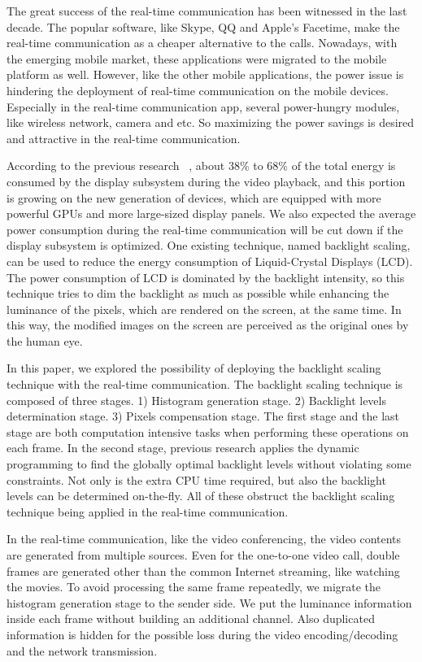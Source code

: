The great success of the real-time communication has been witnessed in
the last decade. The popular software, like Skype, QQ and Apple's
Facetime, make the real-time communication as a cheaper alternative to
the calls. Nowadays, with the emerging mobile market, these
applications were migrated to the mobile platform as well. However,
like the other mobile applications, the power issue is hindering the
deployment of real-time communication on the mobile
devices. Especially in the real-time communication app, several
power-hungry modules, like wireless network, camera and etc. So
maximizing the power savings is desired and attractive in the
real-time communication.


According to the previous research ~\cite{AG10}, about 38\% to 68\% of the
total energy is consumed by the display subsystem during the video
playback, and this portion is growing on the new generation of
devices, which are equipped with more powerful GPUs and more
large-sized display panels. We also expected the average power
consumption during the real-time communication will be cut down if the
display subsystem is optimized. One existing technique, named
backlight scaling, can be used to reduce the energy consumption of
Liquid-Crystal Displays (LCD). The power consumption of LCD is
dominated by the backlight intensity, so this technique tries to dim
the backlight as much as possible while enhancing the luminance of the
pixels, which are rendered on the screen, at the same time. In this
way, the modified images on the screen are perceived as the original
ones by the human eye.  


In this paper, we explored the possibility of deploying the backlight
scaling technique with the real-time communication. The backlight
scaling technique is composed of three stages. 1) Histogram generation
stage. 2) Backlight levels determination stage. 3) Pixels compensation
stage. The first stage and the last stage are both computation
intensive tasks when performing these operations on each frame. In the
second stage, previous research applies the dynamic programming to
find the globally optimal backlight levels without violating some
constraints. Not only is the extra CPU time required, but also the
backlight levels can be determined on-the-fly. All of these obstruct
the backlight scaling technique being applied in the real-time
communication.

In the real-time communication, like the video conferencing, the video
contents are generated from multiple sources. Even for the one-to-one
video call, double frames are generated other than the common Internet
streaming, like watching the movies. To avoid processing the same
frame repeatedly, we migrate the histogram generation stage to the
sender side. We put the luminance information inside each frame
without building an additional channel. Also duplicated information is
hidden for the possible loss during the video encoding/decoding and
the network transmission.

